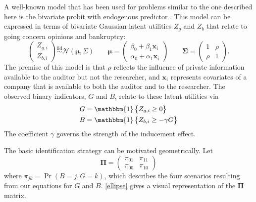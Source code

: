\documentclass[aoas,preprint, 11pt, dvipsnames, table, x11name]{imsart}
\renewcommand{\bm}[1]{\mathbf{#1}}
\theoremstyle{remark}
\begin{document}
	A well-known model that has been used for problems similar to the one described here is the bivariate probit with endogenous predictor \citep[Section~ 15.7.3]{Wooldridge-2010}. This model can be expressed in terms of bivariate Gaussian latent utilities $Z_g$ and $Z_b$ that relate to going concern opinions and bankruptcy: 
	\begin{equation}
		\begin{pmatrix}
			Z_{g,i}\\
			Z_{b,i}
		\end{pmatrix}\stackrel{\text{iid}}{\sim}\mathcal{N}(\bm{\mu}, \Sigma)
		\qquad \bm{\mu}=\begin{pmatrix}
			\beta_0+\beta_1\bm{x}_i\\
			\alpha_0+\alpha_1\bm{x}_i
		\end{pmatrix}
		\qquad
		\bm{\Sigma}=\begin{pmatrix}
			1&\rho\\
			\rho&1
		\end{pmatrix}.
		\label{latentutility}
	\end{equation}
	The premise of this model is that $\rho$ reflects the influence of private information available to the auditor but not the researcher, and $\bm{x}_i$ represents covariates of a company that is available to both the auditor and to the researcher. The observed binary indicators, $G$ and $B$, relate to these latent utilities via
	\begin{align}
		G&=\mathbbm{1}\cbr{Z_{g,i}\geq 0}\\
		B&=\mathbbm{1}\cbr{Z_{b,i}\geq -\gamma G}
		\label{align1}
	\end{align}
	The coefficient $\gamma$ governs the strength of the inducement effect.
	
	The basic identification strategy can be motivated geometrically. Let $$\bm{\Pi}=\begin{pmatrix}
		\pi_{01}&\pi_{11}\\
		\pi_{00}&\pi_{10}
	\end{pmatrix}$$
	where $\pi_{jk}=\Pr(B=j, G=k)$, which describes the four scenarios resulting from our equations for $G$ and $B$.  \autoref{ellipse} gives a visual representation of the $\bm{\Pi}$ matrix.
	
\end{document}
